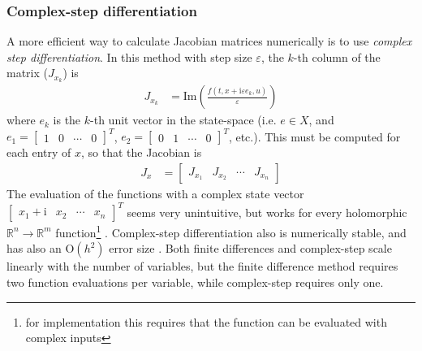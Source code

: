 \subsubsection{Complex-step differentiation}
A more efficient way to calculate Jacobian matrices numerically is to use \textit{complex step differentiation}.
In this method with step size $\varepsilon$, the $k$-th column of the matrix ($J_{x_k}$) is \cite{martins2003}
\begin{align}
    J_{x_k} &= \mathrm{Im} \left( \frac{f(t, x + \mathrm{i} \varepsilon e_k, u)}{\varepsilon} \right)
    \label{eq:appendix_jacobian_complex_step}
\end{align}
where $e_k$ is the $k$-th unit vector in the state-space (i.e. $e \in X$, and $e_1 = [\begin{smallmatrix} 1 & 0 & \cdots & 0 \end{smallmatrix}]^T$, $e_2 = [\begin{smallmatrix} 0 & 1 & \cdots & 0 \end{smallmatrix}]^T$, etc.).
This must be computed for each entry of $x$, so that the Jacobian is 
\begin{align}
    J_x &= \begin{bmatrix}
        J_{x_1} & J_{x_2} & \cdots & J_{x_n} 
    \end{bmatrix} 
\end{align}
The evaluation of the functions with a complex state vector $[\begin{smallmatrix} x_1 + \mathrm{i} & x_2 & \cdots & x_n \end{smallmatrix}]^T$ seems very unintuitive, but works for every holomorphic $\mathbb{R}^n \rightarrow \mathbb{R}^m$ function\footnote{for implementation this requires that the function can be evaluated with complex inputs} \cite{martins2021}.
Complex-step differentiation also is numerically stable, and has also an $\mathrm{O}(h^2)$ error size \cite{martins2003}. 
Both finite differences and complex-step scale linearly with the number of variables, but the finite difference method requires two function evaluations per variable, while complex-step requires only one.


